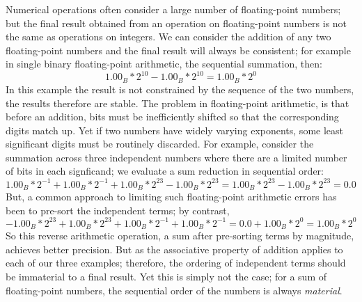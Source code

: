 \documentclass[7pt]{article}
\begin{document}
Numerical operations often consider a large number of floating-point numbers; but the final result obtained from an operation on floating-point numbers is not the same as operations on integers. We can consider the addition of any two floating-point numbers and the final result will always be consistent; for example in single binary floating-point arithmetic, the sequential summation, then:
\begin{equation*}
1.00_B*2^{10}  - 1.00_B*2^{10} = 1.00_B*2^{0}
\end{equation*} 
In this example the result is not constrained by the sequence of the two numbers, the results therefore are stable. The problem in floating-point arithmetic, is that before an addition, bits must be inefficiently shifted so that the corresponding digits match up. Yet if two numbers have widely varying  exponents, some least significant digits must be routinely discarded.  For example, consider the summation across three independent numbers where there are a limited number of bits in each signficand; we evaluate a sum reduction in sequential order:
\begin{equation*}
1.00_B*2^{-1}  + 1.00_B*2^{-1}  + 1.00_B*2^{23} -  1.00_B*2^{23} =  1.00_B*2^{23} -  1.00_B*2^{23} = 0.0
\end{equation*} 
But, a common approach to limiting such floating-point arithmetic errors has been to pre-sort the independent terms; by contrast, 
\begin{equation*}
 -  1.00_B*2^{23} + 1.00_B*2^{23} +1.00_B*2^{-1}  + 1.00_B*2^{-1}  = 0.0 + 1.00_B*2^{0}  = 1.00_B*2^{0}   
\end{equation*} 
So this reverse arithmetic operation, a sum after pre-sorting terms by magnitude, achieves better precision. But as the associative property of addition applies to each of our three examples; therefore, the ordering of independent terms should be immaterial to a final result. Yet this is simply not the case; for a sum of floating-point numbers, the sequential order of the numbers is always \emph{material}. 
\end{document}
